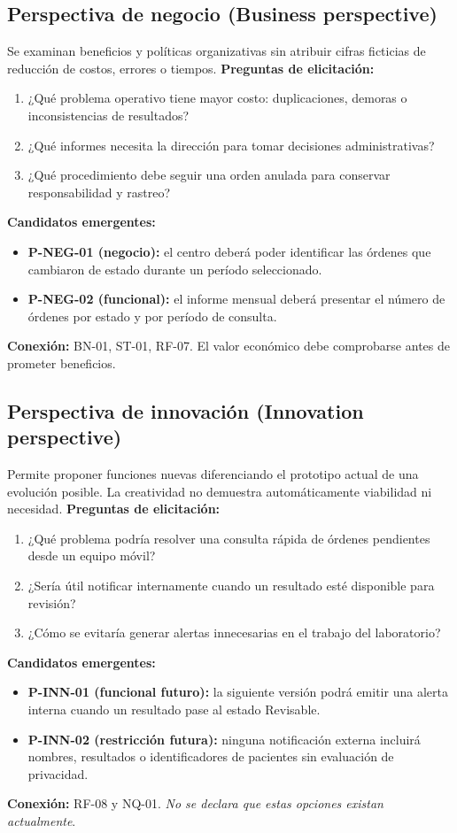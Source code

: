 \subsection{Perspectiva de negocio (Business perspective)}
Se examinan beneficios y políticas organizativas sin atribuir cifras ficticias de reducción de costos, errores o tiempos.
\textbf{Preguntas de elicitación:}
\begin{enumerate}[label=\alph*)]
\item ¿Qué problema operativo tiene mayor costo: duplicaciones, demoras o inconsistencias de resultados?
\item ¿Qué informes necesita la dirección para tomar decisiones administrativas?
\item ¿Qué procedimiento debe seguir una orden anulada para conservar responsabilidad y rastreo?
\end{enumerate}
\textbf{Candidatos emergentes:}
\begin{itemize}
\item \textbf{P-NEG-01 (negocio):} el centro deberá poder identificar las órdenes que cambiaron de estado durante un período seleccionado.
\item \textbf{P-NEG-02 (funcional):} el informe mensual deberá presentar el número de órdenes por estado y por período de consulta.
\end{itemize}
\textbf{Conexión:} BN-01, ST-01, RF-07. El valor económico debe comprobarse antes de prometer beneficios.

\subsection{Perspectiva de innovación (Innovation perspective)}
Permite proponer funciones nuevas diferenciando el prototipo actual de una evolución posible. La creatividad no demuestra automáticamente viabilidad ni necesidad.
\textbf{Preguntas de elicitación:}
\begin{enumerate}[label=\alph*)]
\item ¿Qué problema podría resolver una consulta rápida de órdenes pendientes desde un equipo móvil?
\item ¿Sería útil notificar internamente cuando un resultado esté disponible para revisión?
\item ¿Cómo se evitaría generar alertas innecesarias en el trabajo del laboratorio?
\end{enumerate}
\textbf{Candidatos emergentes:}
\begin{itemize}
\item \textbf{P-INN-01 (funcional futuro):} la siguiente versión podrá emitir una alerta interna cuando un resultado pase al estado Revisable.
\item \textbf{P-INN-02 (restricción futura):} ninguna notificación externa incluirá nombres, resultados o identificadores de pacientes sin evaluación de privacidad.
\end{itemize}
\textbf{Conexión:} RF-08 y NQ-01. \emph{No se declara que estas opciones existan actualmente}.

